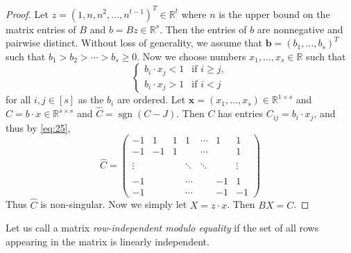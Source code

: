 \documentclass[letterpaper]{article}
\theoremstyle{definition}
\newcommand{\RR}{\mathbb{R}}
\renewcommand{\vec}[1]{\mathbf{#1}}
\newcommand{\sgn}{\operatorname{sgn}}
\begin{document}
\begin{proof}
	Let $z=(1,n,n^2,\ldots,n^{t-1})^T\in \RR^t$ where $n$ is the upper bound on the matrix entries of $B$  and $b=B z\in\RR^s$. 
	Then the entries of $b$ are nonnegative and pairwise distinct.
	Without loss of generality, we assume that $\vec b=(b_1,\ldots,b_s)^T$ such that $b_1>b_2>\cdots >b_s\ge 0$. Now we choose numbers $x_{1},\ldots,x_s\in\RR$ such that
	\begin{equation}
		\label{eq:25}
		\begin{cases}
			b_{i}\cdot x_j<1 & \text{if }i\ge j, \\
			b_i\cdot x_j>1   & \text{if }i<j     
		\end{cases}
	\end{equation}
	for all $i,j\in[s]$ as the $b_i$ are ordered. 
	Let $\vec x=(x_1,\ldots,x_s)\in\RR^{1\times s}$ and $C=  b\cdot x\in\RR^{s\times s}$ and $\hat C =\sgn(C-J)$. 
	Then $C$ has entries $C_{ij}=b_i\cdot x_j$, and thus by \eqref{eq:25}, 
	\begin{equation}
		\label{eq:29}
		\hat C=
		\begin{pmatrix}
			-1     & 1  & 1 & 1      & \cdots & 1  & 1      \\
			-1     & -1 & 1 &        & \cdots &    & 1      \\
			\\
			\vdots &    &   & \ddots & \ddots &    & \vdots \\
			\\
			-1     &    &   & \cdots &        & -1 & 1      \\
			-1     &    &   & \cdots &        & -1 & -1     
		\end{pmatrix}
	\end{equation}
	Thus $\hat C$ is non-singular. Now we simply let $X= z\cdot x$. Then $BX=C$.
\end{proof}
Let us call a matrix \emph{row-independent modulo equality} if the set
of all rows appearing in the matrix is linearly independent.
\end{document}
